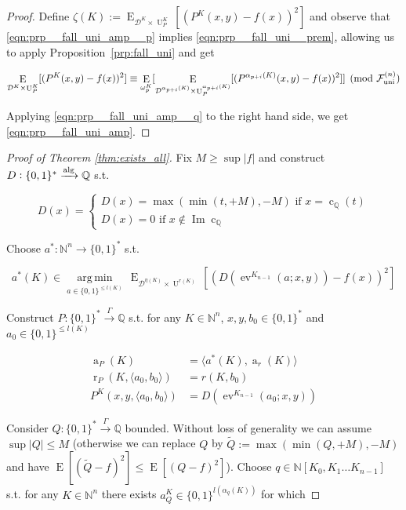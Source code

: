 \documentclass[11pt]{article}
\numberwithin{equation}{section}
\theoremstyle{definition}
\theoremstyle{plain}
\newcommand{\Bool}{\{0,1\}}
\newcommand{\Words}{{\Bool^*}}
\DeclareMathOperator{\Img}{Im}
\DeclareMathOperator{\E}{E}
\DeclareMathOperator{\Ev}{ev}
\DeclareMathOperator{\R}{r}
\DeclareMathOperator{\A}{a}
\DeclareMathOperator{\Un}{U}
\DeclareMathOperator{\En}{c}
\newcommand{\Argmin}[1]{\underset{#1}{\operatorname{arg\,min}}\,}
\newcommand{\Nats}{\mathbb{N}}
\newcommand{\Rats}{\mathbb{Q}}
\newcommand{\NatPoly}{\Nats[K_0, K_1 \ldots K_{n-1}]}
\newcommand{\Abs}[1]{\lvert #1 \rvert}
\newcommand{\Chev}[1]{\langle #1 \rangle}
\newcommand{\Dist}{\mathcal{D}}
\newcommand{\Fall}{\mathcal{F}}
\newcommand{\FallU}{{\Fall_{\textnormal{uni}}^{(n)}}}
\newcommand{\Alg}{\xrightarrow{\textnormal{alg}}}
\newcommand{\Scheme}{\xrightarrow{\Gamma}}
\begin{document}
\begin{proof}

Define ${\zeta(K):=\E_{\Dist^{K} \times \Un_P^{K}}[(P^{K}(x,y)-f(x))^2]}$ and observe that \ref{eqn:prp__fall_uni_amp__p} implies \ref{eqn:prp__fall_uni__prem}, allowing us to apply Proposition~\ref{prp:fall_uni} and get

\[\E_{\Dist^{K} \times \Un_P^{K}}[(P^{K}(x,y)-f(x))^2] \equiv \E_{\omega_p^K}[\E_{ \Dist^{\alpha_{p+i}(K)} \times \Un_P^{\alpha_{p+i}(K)}}[(P^{\alpha_{p+i}(K)}(x,y)-f(x))^2]] \pmod \FallU\]

Applying \ref{eqn:prp__fall_uni_amp__q} to the right hand side, we get \ref{eqn:prp__fall_uni_amp}.
%
\end{proof}

\begin{proof}[Proof of Theorem \ref{thm:exists_all}]

Fix $M \geq \sup \Abs{f}$ and construct ${D: \Words \Alg \Rats}$ s.t.

\[D(x)=\begin{cases}D(x)=\max(\min(t,+M),-M) \text{ if ${x = \En_\Rats(t)}$}\\D(x)=0 \text{ if } x \not\in \Img \En_\Rats\end{cases}\]

Choose ${a^*: \Nats^n \rightarrow \Words}$ s.t.

\begin{equation}
\label{eqn:thm__exists_all__astar}
a^*(K) \in \Argmin{a \in \Bool^{\leq l(K)}} \E_{\Dist^{\eta(K)} \times \Un^{r(K)}}[(D(\Ev^{K_{n-1}}(a;x,y))-f(x))^2]
\end{equation} 

Construct ${P: \Words \Scheme \Rats}$ s.t. for any ${K \in \Nats^n}$, ${x,y,b_0 \in \Words}$ and ${a_0 \in \Bool^{\leq l(K)}}$

\begin{align}
\A_P(K) &= \Chev{a^*(K),\A_r(K)}\\
\R_P(K,\Chev{a_0,b_0}) &= r(K,b_0) \\
P^K(x,y,\Chev{a_0,b_0}) &= D(\Ev^{K_{n-1}}(a_0;x,y))
\end{align}

Consider ${Q: \Words \Scheme \Rats}$ bounded. Without loss of generality we can assume $\sup \Abs{Q} \leq M$ (otherwise we can replace ${Q}$ by ${\tilde{Q}:=\max(\min(Q,+M),-M)}$ and have ${\E[(\tilde{Q}-f)^2]\leq\E[(Q-f)^2]}$). Choose ${q \in \NatPoly}$ s.t. for any ${K \in \Nats^n}$ there exists ${a_Q^K \in \Bool^{l(\alpha_q(K))}}$ for which


\end{proof}
\end{document}

